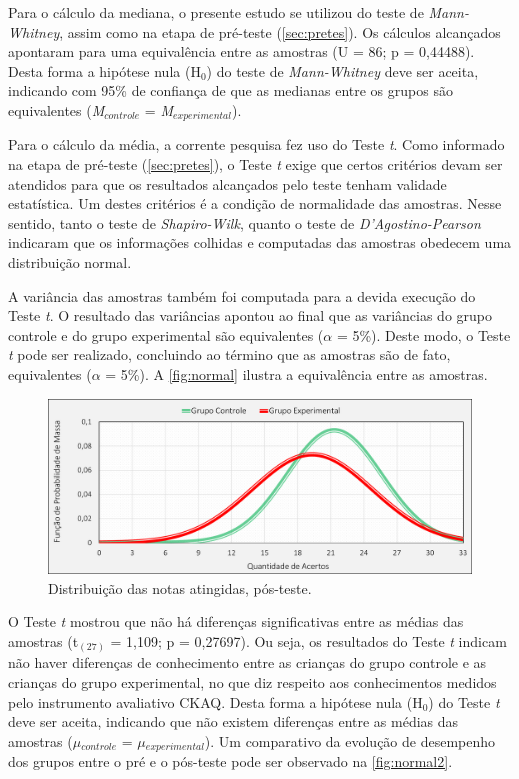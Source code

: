 Para o cálculo da mediana, o presente estudo se utilizou do teste de \textit{Mann-Whitney}, assim como na etapa de pré-teste (\autoref{sec:pretes}). Os cálculos alcançados apontaram para uma equivalência entre as amostras (U = 86; p = 0,44488). Desta forma a hipótese nula (H$_0$) do teste de \textit{Mann-Whitney} deve ser aceita, indicando com 95\% de confiança de que as medianas entre os grupos são equivalentes (\textit{M}$_{controle}$ = \textit{M}$_{experimental}$). 

Para o cálculo da média, a corrente pesquisa fez uso do Teste \textit{t}. Como informado na etapa de pré-teste (\autoref{sec:pretes}), o Teste \textit{t} exige que certos critérios devam ser atendidos para que os resultados alcançados pelo teste tenham validade estatística. Um destes critérios é a condição de normalidade das amostras. Nesse sentido, tanto o teste de \textit{Shapiro-Wilk}, quanto o teste de \textit{D'Agostino-Pearson} indicaram que os informações colhidas e computadas das amostras obedecem uma distribuição normal. 

A variância das amostras também foi computada para a devida execução do Teste \textit{t}. O resultado das variâncias apontou ao final que as variâncias do grupo controle e do grupo experimental são equivalentes ($\alpha$ = 5\%). Deste modo, o Teste \textit{t} pode ser realizado, concluindo ao término que as amostras são de fato, equivalentes ($\alpha$ = 5\%). A \autoref{fig:normal} ilustra a equivalência entre as amostras.

\pagebreak

\begin{figure}[htb]
    \centering
    \caption{\label{fig:normal1}Distribuição das notas atingidas, pós-teste.}
    \includegraphics[width=\linewidth]{./Visuais/GraficosPosteste.pdf}
\end{figure}


O Teste \textit{t} mostrou que não há diferenças significativas entre as médias das amostras (t$_{(27)}$ = 1,109; p = 0,27697). Ou seja, os resultados do Teste \textit{t} indicam não haver diferenças de conhecimento entre as crianças do grupo controle e as crianças do grupo experimental, no que diz respeito aos conhecimentos medidos pelo instrumento avaliativo \ac{CKAQ}. Desta forma a hipótese nula (H$_0$) do Teste \textit{t} deve ser aceita, indicando que não existem diferenças entre as médias das amostras ($\mu$$_{controle}$ = $\mu$$_{experimental}$). %
Um comparativo da evolução de desempenho dos grupos entre o pré e o pós-teste pode ser observado na \autoref{fig:normal2}.

